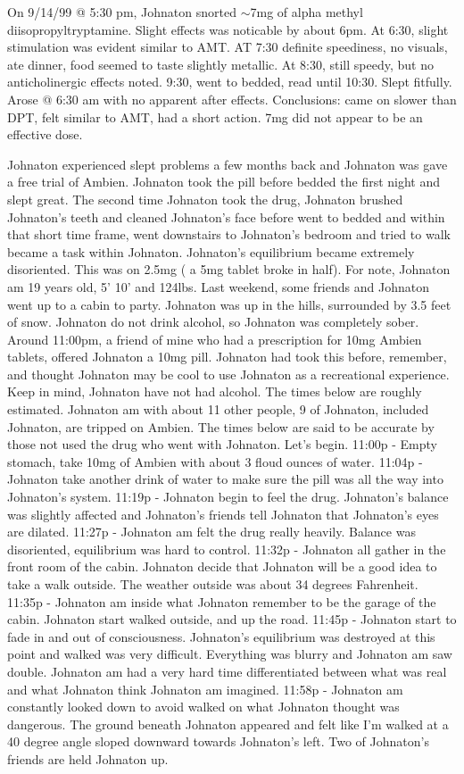 \documentclass[12pt]{book}
\begin{document}
On 9/14/99 @ 5:30 pm, Johnaton snorted $\sim$7mg of alpha methyl diisopropyltryptamine. Slight effects was noticable by about 6pm. At 6:30, slight stimulation was evident similar to AMT. AT 7:30 definite speediness, no visuals, ate dinner, food seemed to taste slightly metallic. At 8:30, still speedy, but no anticholinergic effects noted. 9:30, went to bedded, read until 10:30. Slept fitfully. Arose @ 6:30 am with no apparent after effects. Conclusions: came on slower than DPT, felt similar to AMT, had a short action. 7mg did not appear to be an effective dose.



Johnaton experienced slept problems a few months back and Johnaton was gave a free trial of Ambien. Johnaton took the pill before bedded the first night and slept great. The second time Johnaton took the drug, Johnaton brushed Johnaton's teeth and cleaned Johnaton's face before went to bedded and within that short time frame, went downstairs to Johnaton's bedroom and tried to walk became a task within Johnaton. Johnaton's equilibrium became extremely disoriented. This was on 2.5mg ( a 5mg tablet broke in half). For note, Johnaton am 19 years old, 5' 10' and 124lbs. Last weekend, some friends and Johnaton went up to a cabin to party. Johnaton was up in the hills, surrounded by 3.5 feet of snow. Johnaton do not drink alcohol, so Johnaton was completely sober. Around 11:00pm, a friend of mine who had a prescription for 10mg Ambien tablets, offered Johnaton a 10mg pill. Johnaton had took this before, remember, and thought Johnaton may be cool to use Johnaton as a recreational experience. Keep in mind, Johnaton have not had alcohol. The times below are roughly estimated. Johnaton am with about 11 other people, 9 of Johnaton, included Johnaton, are tripped on Ambien. The times below are said to be accurate by those not used the drug who went with Johnaton. Let's begin. 11:00p - Empty stomach, take 10mg of Ambien with about 3 floud ounces of water. 11:04p - Johnaton take another drink of water to make sure the pill was all the way into Johnaton's system. 11:19p - Johnaton begin to feel the drug. Johnaton's balance was slightly affected and Johnaton's friends tell Johnaton that Johnaton's eyes are dilated. 11:27p - Johnaton am felt the drug really heavily. Balance was disoriented, equilibrium was hard to control. 11:32p - Johnaton all gather in the front room of the cabin. Johnaton decide that Johnaton will be a good idea to take a walk outside. The weather outside was about 34 degrees Fahrenheit. 11:35p - Johnaton am inside what Johnaton remember to be the garage of the cabin. Johnaton start walked outside, and up the road. 11:45p - Johnaton start to fade in and out of consciousness. Johnaton's equilibrium was destroyed at this point and walked was very difficult. Everything was blurry and Johnaton am saw double. Johnaton am had a very hard time differentiated between what was real and what Johnaton think Johnaton am imagined. 11:58p - Johnaton am constantly looked down to avoid walked on what Johnaton thought was dangerous. The ground beneath Johnaton appeared and felt like I'm walked at a 40 degree angle sloped downward towards Johnaton's left. Two of Johnaton's friends are held Johnaton up. 
\end{document}
